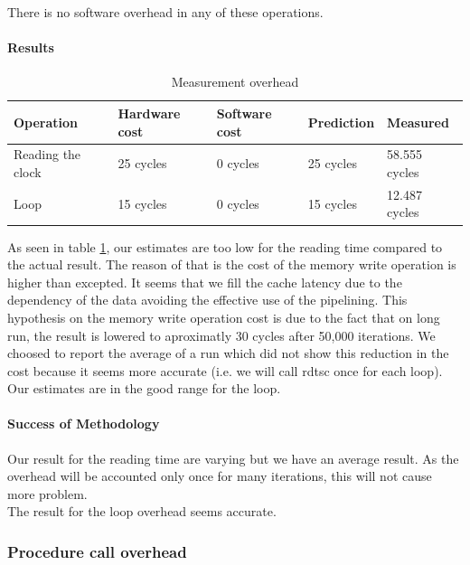 There is no software overhead in any of these operations.

\paragraph{Results}
\begin{table}[h]
\begin{center}
\begin{tabular}{| l | l | l | l | l |} \hline
Operation 			& Hardware cost 	& Software cost 	& Prediction	& Measured \\ \hline
Reading the clock 	& 25 cycles		& 0 cycles			& 25 cycles 	& 58.555 cycles \\ \hline
Loop 				& 15 cycles 		& 0 cycles 		& 15 cycles 	& 12.487 cycles \\ \hline
\end{tabular}
\end{center}
\caption{Measurement overhead\label{tab:measurement-overhead}}

\end{table}

As seen in table \ref{tab:measurement-overhead}, our estimates are too low for the reading time compared to the actual result. The reason of that is the cost of the memory write operation is
higher than excepted. It seems that we fill the cache latency due to the dependency of the data avoiding the effective use of the pipelining.
This hypothesis on the memory write operation cost is due to the fact that on long run,
the result is lowered to aproximatly 30 cycles after 50,000 iterations.
We choosed to report the average of a run which did not show this reduction in
the cost because it seems more accurate (i.e. we will call rdtsc once for each
loop).\\

Our estimates are in the good range for the loop.

\paragraph{Success of Methodology}
Our result for the reading time are varying but we have an average result. As
the overhead will be accounted only once for many iterations, this will not
cause more problem.\\

The result for the loop overhead seems accurate.

\subsubsection{Procedure call overhead}
